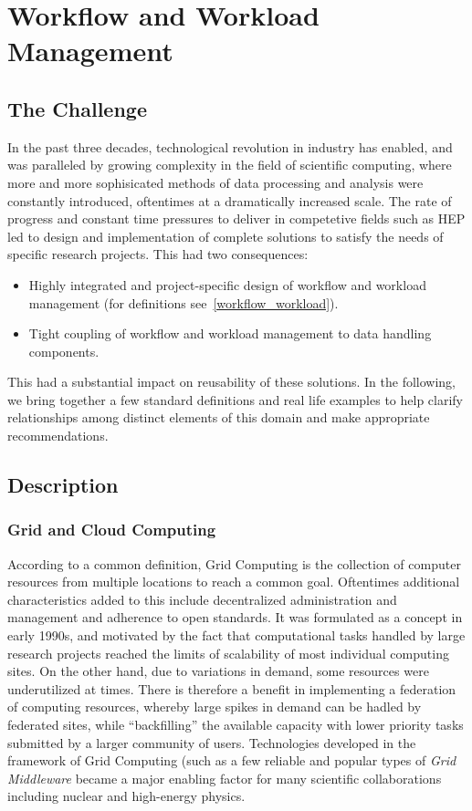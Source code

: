 \newpage
\section{Workflow and Workload Management}
\subsection{The Challenge}
In the past three decades, technological revolution in industry has enabled, and was paralleled by growing complexity in the field of scientific computing, where 
more and more sophisicated methods of data processing and analysis were constantly introduced, oftentimes at a dramatically increased scale. The rate of progress
and constant time pressures to deliver in competetive fields such as HEP led to design and implementation of complete solutions to satisfy the needs of specific  research projects.
This had two consequences:

\begin{itemize}
\item Highly integrated and project-specific design of workflow and workload management (for definitions see~\ref{workflow_workload}).
\item Tight coupling of workflow and workload management to data handling components.
\end{itemize}
This had a substantial impact on reusability of these solutions. In the following, we  bring together a few standard definitions and real life examples to help clarify relationships among distinct elements of this domain and make appropriate recommendations.

\subsection{Description}

\subsubsection{Grid and Cloud Computing}
According to a common definition, Grid Computing is the collection of computer resources from multiple locations to reach a common goal. Oftentimes additional characteristics added to this include decentralized
administration and management and adherence to open standards. It was formulated as a concept in early 1990s, and motivated by the fact that computational tasks handled by large research projects reached
the limits of scalability of most individual computing sites. On the other hand, due to variations in demand, some resources were underutilized at times. There is therefore a benefit in implementing a federation of
computing resources, whereby large spikes in demand can be hadled by federated sites, while ``backfilling'' the available capacity with lower priority tasks submitted by a larger community of users.
Technologies developed in the framework of Grid Computing (such as a few reliable and popular types of \textit{Grid Middleware} became a major enabling factor for many scientific collaborations including
nuclear and high-energy physics.

